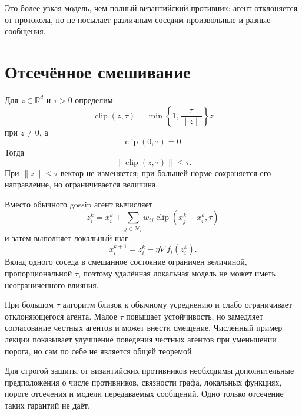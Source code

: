 Это более узкая модель, чем полный византийский противник: агент
отклоняется от протокола, но не посылает различным соседям
произвольные и разные сообщения.

\section{Отсечённое смешивание}

Для \(z\in\mathbb R^d\) и \(\tau>0\) определим
\[
    \operatorname{clip}(z,\tau)
    =
    \min
    \left\{
        1,
        \frac{\tau}{\lVert z\rVert}
    \right\}z
\]
при \(z\ne0\), а
\[
    \operatorname{clip}(0,\tau)=0.
\]
Тогда
\[
    \lVert\operatorname{clip}(z,\tau)\rVert
    \le\tau.
\]
При \(\lVert z\rVert\le\tau\) вектор не изменяется; при большей норме
сохраняется его направление, но ограничивается величина.

Вместо обычного gossip агент вычисляет
\[
    z_i^k
    =
    x_i^k
    +
    \sum_{j\in\mathcal N_i}
    w_{ij}
    \operatorname{clip}
    \left(
        x_j^k-x_i^k,
        \tau
    \right)
\]
и затем выполняет локальный шаг
\[
    x_i^{k+1}
    =
    z_i^k-\eta\nabla f_i(z_i^k).
\]
Вклад одного соседа в смешанное состояние ограничен величиной,
пропорциональной \(\tau\), поэтому удалённая локальная модель не может
иметь неограниченного влияния.

При большом \(\tau\) алгоритм близок к обычному усреднению и слабо
ограничивает отклоняющегося агента. Малое \(\tau\) повышает
устойчивость, но замедляет согласование честных агентов и может внести
смещение. Численный пример лекции показывает улучшение поведения
честных агентов при уменьшении порога, но сам по себе не является
общей теоремой.

Для строгой защиты от византийских противников необходимы
дополнительные предположения о числе противников, связности графа,
локальных функциях, пороге отсечения и модели передаваемых сообщений.
Одно только отсечение таких гарантий не даёт.

